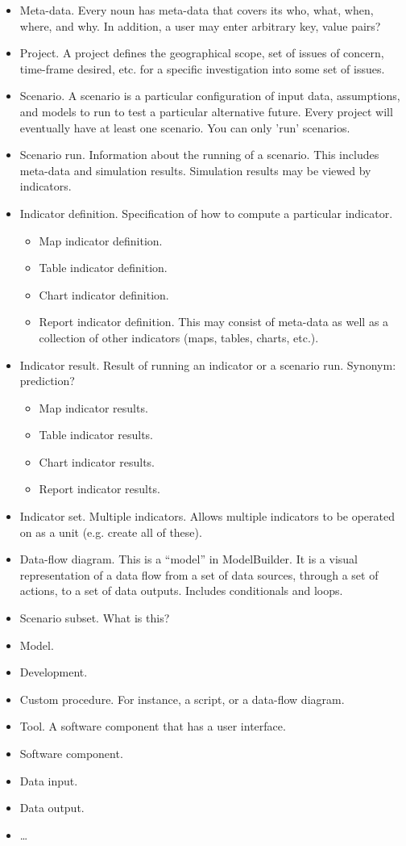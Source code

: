\documentclass[titlepage]{article}
\begin{document}
\begin{itemize}
  \item Meta-data.  Every noun has meta-data that covers its who, what, when, where, and why.  In addition, a user may enter arbitrary key, value pairs?
  \item Project.  A project defines the geographical scope, set of issues of concern, time-frame desired, etc. for a specific investigation into some set of issues.
  \item Scenario.  A scenario is a particular configuration of input data, assumptions, and models to run to test a particular alternative future.  Every project will eventually have at least one scenario.  You can only 'run' scenarios.
  \item Scenario run.  Information about the running of a scenario.  This includes meta-data and simulation results.  Simulation results may be viewed by indicators.
  \item Indicator definition.  Specification of how to compute a particular indicator.  
  \begin{itemize}
	  \item Map indicator definition.
	  \item Table indicator definition.
	  \item Chart indicator definition.
	  \item Report indicator definition.  This may consist of meta-data as well as a collection of other indicators (maps, tables, charts, etc.).
  \end{itemize}
  \item Indicator result.  Result of running an indicator or a scenario run.  Synonym: prediction?
  \begin{itemize}
	  \item Map indicator results.
	  \item Table indicator results.
	  \item Chart indicator results.
	  \item Report indicator results.  
  \end{itemize}
  \item Indicator set.  Multiple indicators.  Allows multiple indicators to be operated on as a unit (e.g. create all of these).
  \item Data-flow diagram.  This is a ``model'' in ModelBuilder.  It is a visual representation of a data flow from a set of data sources, through a set of actions, to a set of data outputs.  Includes conditionals and loops.
  \item Scenario subset.  What is this?
  \item Model. 
  \item Development.
  \item Custom procedure.  For instance, a script, or a data-flow diagram.
  \item Tool.  A software component that has a user interface.
  \item Software component.
  \item Data input.
  \item Data output.
  \item \ldots
\end{itemize}
\end{document}
